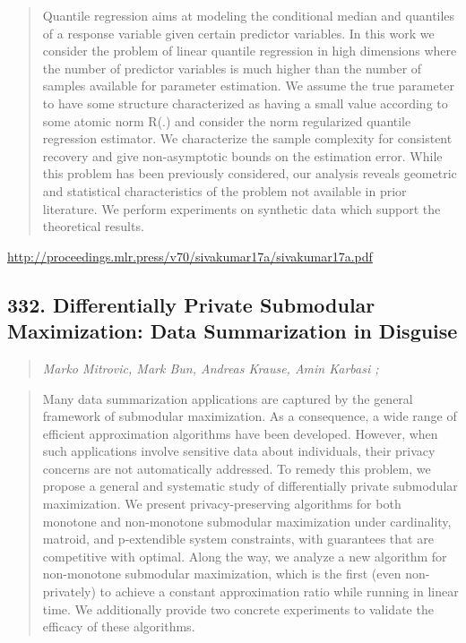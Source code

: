 \documentclass{article}
\begin{document}
\begin{quote}
    Quantile regression aims at modeling the conditional median and quantiles of a response variable given certain predictor variables. In this work we consider the problem of linear quantile regression in high dimensions where the number of predictor variables is much higher than the number of samples available for parameter estimation. We assume the true parameter to have some structure characterized as having a small value according to some atomic norm R(.) and consider the norm regularized quantile regression estimator. We characterize the sample complexity for consistent recovery and give non-asymptotic bounds on the estimation error. While this problem has been previously considered, our analysis reveals geometric and statistical characteristics of the problem not available in prior literature. We perform experiments on synthetic data which support the theoretical results.  
\end{quote}

\href{http://proceedings.mlr.press/v70/sivakumar17a/sivakumar17a.pdf}{http://proceedings.mlr.press/v70/sivakumar17a/sivakumar17a.pdf}

\subsection{332. Differentially Private Submodular Maximization: Data Summarization in Disguise}

\begin{quote}
\footnotesize{\textit{Marko Mitrovic, Mark Bun, Andreas Krause, Amin Karbasi ;}}

\end{quote}

\begin{quote}
    Many data summarization applications are captured by the general framework of submodular maximization. As a consequence, a wide range of efficient approximation algorithms have been developed. However, when such applications involve sensitive data about individuals, their privacy concerns are not automatically addressed. To remedy this problem, we propose a general and systematic study of differentially private submodular maximization. We present privacy-preserving algorithms for both monotone and non-monotone submodular maximization under cardinality, matroid, and p-extendible system constraints, with guarantees that are competitive with optimal. Along the way, we analyze a new algorithm for non-monotone submodular maximization, which is the first (even non-privately) to achieve a constant approximation ratio while running in linear time. We additionally provide two concrete experiments to validate the efficacy of these algorithms.  
\end{quote}
\end{document}
